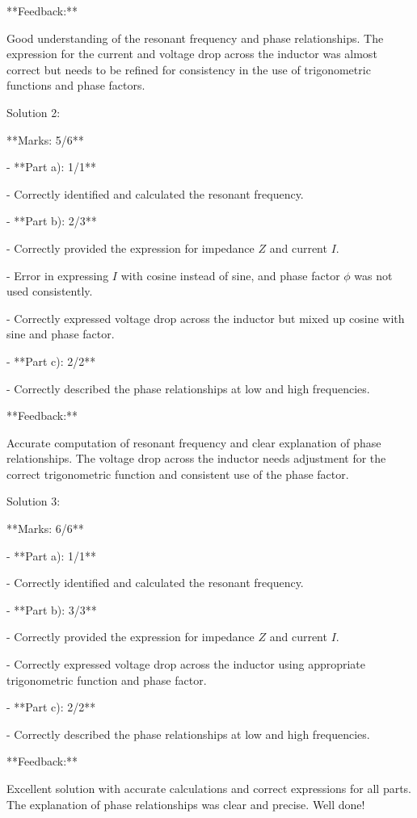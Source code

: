 \documentclass[a4paper,11pt]{article}
\begin{document}
**Feedback:**

Good understanding of the resonant frequency and phase relationships. The expression for the current and voltage drop across the inductor was almost correct but needs to be refined for consistency in the use of trigonometric functions and phase factors.

Solution 2:

**Marks: 5/6**

- **Part a): 1/1**

  - Correctly identified and calculated the resonant frequency.
  
- **Part b): 2/3**

  - Correctly provided the expression for impedance \( Z \) and current \( I \).
  
  - Error in expressing \( I \) with cosine instead of sine, and phase factor \(\phi\) was not used consistently.
  
  - Correctly expressed voltage drop across the inductor but mixed up cosine with sine and phase factor.
  
- **Part c): 2/2**

  - Correctly described the phase relationships at low and high frequencies.

**Feedback:**

Accurate computation of resonant frequency and clear explanation of phase relationships. The voltage drop across the inductor needs adjustment for the correct trigonometric function and consistent use of the phase factor.

Solution 3:

**Marks: 6/6**

- **Part a): 1/1**

  - Correctly identified and calculated the resonant frequency.
  
- **Part b): 3/3**

  - Correctly provided the expression for impedance \( Z \) and current \( I \).
  
  - Correctly expressed voltage drop across the inductor using appropriate trigonometric function and phase factor.
  
- **Part c): 2/2**

  - Correctly described the phase relationships at low and high frequencies.

**Feedback:**

Excellent solution with accurate calculations and correct expressions for all parts. The explanation of phase relationships was clear and precise. Well done!
\end{document}
